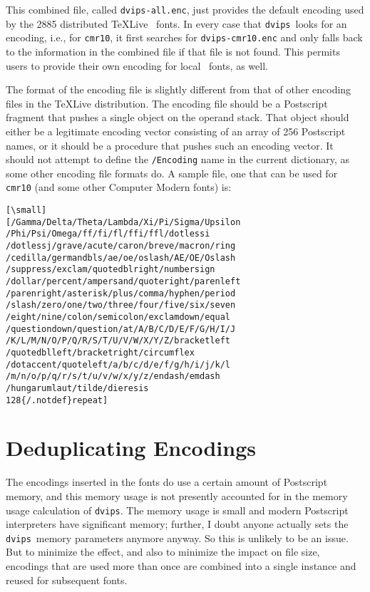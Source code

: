 \documentclass{ltugboat}
\def\dvips{\texttt{dvips}}
\begin{document}
This combined file, called \texttt{dvips-all.enc}, just provides
the default encoding used by the 2885 distributed \TeX Live
\MF\ fonts.  In every case that \dvips\ looks for an encoding,
i.e., for \texttt{cmr10}, it first searches for \texttt{dvips-cmr10.enc}
and only falls back to the information in the combined file if
that file is not found.  This permits users to provide their
own encoding for local \MF\ fonts, as well.

The format of the encoding file is slightly different from that
of other encoding files in the \TeX Live distribution.  The
encoding file should be a Postscript fragment that pushes a
single object on the operand stack.  That object should either be a
legitimate encoding vector consisting of an array of 256
Postscript names, or it should be a procedure that pushes
such an encoding vector.  It should not attempt to define
the \texttt{/Encoding} name in the current dictionary, as some other
encoding file formats do.  A sample file, one that can be used
for \texttt{cmr10} (and some other Computer Modern fonts) is:

\begin{verbatim}[\small]
[/Gamma/Delta/Theta/Lambda/Xi/Pi/Sigma/Upsilon
/Phi/Psi/Omega/ff/fi/fl/ffi/ffl/dotlessi
/dotlessj/grave/acute/caron/breve/macron/ring
/cedilla/germandbls/ae/oe/oslash/AE/OE/Oslash
/suppress/exclam/quotedblright/numbersign
/dollar/percent/ampersand/quoteright/parenleft
/parenright/asterisk/plus/comma/hyphen/period
/slash/zero/one/two/three/four/five/six/seven
/eight/nine/colon/semicolon/exclamdown/equal
/questiondown/question/at/A/B/C/D/E/F/G/H/I/J
/K/L/M/N/O/P/Q/R/S/T/U/V/W/X/Y/Z/bracketleft
/quotedblleft/bracketright/circumflex
/dotaccent/quoteleft/a/b/c/d/e/f/g/h/i/j/k/l
/m/n/o/p/q/r/s/t/u/v/w/x/y/z/endash/emdash
/hungarumlaut/tilde/dieresis
128{/.notdef}repeat]
\end{verbatim}

\section{Deduplicating Encodings}

The encodings inserted in the fonts do use a certain amount of
Postscript memory, and this memory usage is not presently
accounted for in the memory usage calculation of \dvips.
The memory usage is small and modern Postscript interpreters
have significant memory; further, I doubt anyone actually sets
the \dvips\ memory parameters anymore anyway.  So this is unlikely
to be an issue.  But to minimize the effect, and also to
minimize the impact on file size, encodings that are used more
than once are combined into a single instance and reused for
subsequent fonts.
\end{document}
